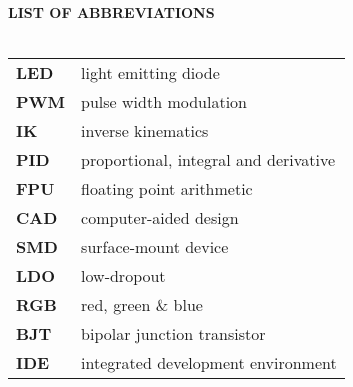 \newpage
{}
\Large{\textbf{LIST OF ABBREVIATIONS}}\\
\normalsize{}\\
\begin{tabular}{ p{5cm} l}
  \textbf{LED} & light emitting diode\\
  \textbf{PWM} & pulse width modulation\\
  \textbf{IK} & inverse kinematics\\
  \textbf{PID} & proportional, integral and derivative\\
  \textbf{FPU} & floating point arithmetic \\
  \textbf{CAD} & computer-aided design\\
  \textbf{SMD} & surface-mount device\\
  \textbf{LDO} & low-dropout\\
  \textbf{RGB} & red, green \& blue\\
  \textbf{BJT} & bipolar junction transistor\\
  \textbf{IDE} & integrated development environment

\end{tabular}